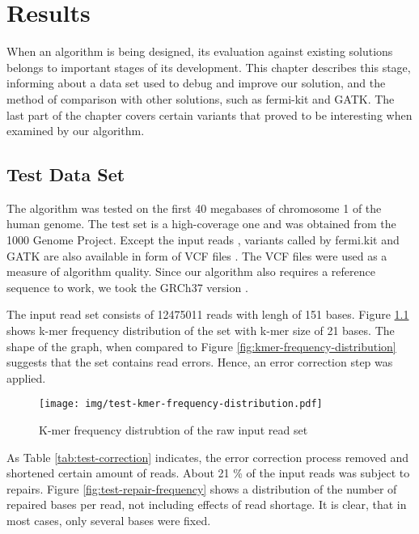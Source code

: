 \chapter{Results}
\label{chap:results}

When an algorithm is being designed, its evaluation against existing solutions belongs to important stages of its development. This chapter describes this stage, informing about a data set used to debug and improve our solution, and the method of comparison with other solutions, such as fermi-kit and GATK. The last part of the chapter covers certain variants that proved to be interesting when examined by our algorithm.

\section{Test Data Set}
\label{sec:test-data-set}

The algorithm was tested on the first 40 megabases of chromosome 1 of the human genome. The test set is a high-coverage one and was obtained from the 1000 Genome Project. Except the input reads \cite{testreads}, variants called by fermi.kit and GATK are also available in form of VCF files \cite{testvcf}. The VCF files were used as a measure of algorithm quality. Since our algorithm also requires a reference sequence to work, we took the GRCh37 version \cite{testref}.

The input read set consists of 12475011 reads with lengh of 151 bases. Figure \ref{fig:test-kmer-frequency-distribution} shows k-mer frequency distribution of the set with k-mer size of 21 bases. The shape of the graph, when compared to Figure \ref{fig:kmer-frequency-distribution} suggests that the set contains read errors. Hence, an error correction step was applied.

\begin{figure}[h]
	\centering
	\texttt{[image: img/test-kmer-frequency-distribution.pdf]}
	\caption{K-mer frequency distrubtion of the raw input read set}
	\label{fig:test-kmer-frequency-distribution}
\end{figure}


As Table \ref{tab:test-correction} indicates, the error correction process removed and shortened certain amount of reads. About 21 \% of the input reads was subject to repairs. Figure \ref{fig:test-repair-frequency} shows a distribution of the number of repaired bases per read, not including effects of read shortage. It is clear, that in most cases, only several bases were fixed. 

